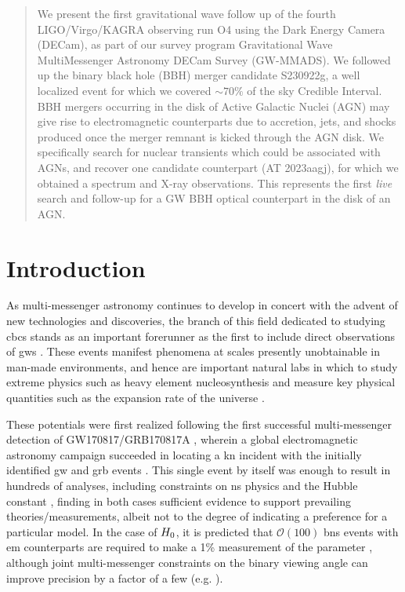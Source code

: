 \documentclass[twocolumn]{aastex631}
\begin{document}
\begin{abstract}
We present the first gravitational wave follow up of the fourth LIGO/Virgo/KAGRA observing run O4 using the Dark Energy Camera (DECam), as part of our survey program Gravitational Wave MultiMessenger Astronomy DECam Survey (GW-MMADS). We followed up the binary black hole (BBH) merger candidate S230922g, a well localized event for which we covered $\sim 70\%$ of the sky Credible Interval. BBH mergers occurring in the disk of Active Galactic Nuclei (AGN) may give rise to electromagnetic counterparts due to accretion, jets, and shocks produced once the merger remnant is kicked through the AGN disk. We specifically search for nuclear transients which could be associated with AGNs, and recover one candidate counterpart (AT 2023aagj), for which we obtained a spectrum and X-ray observations. This represents the first \emph{live} search and follow-up for a GW BBH optical counterpart in the disk of an AGN.
\end{abstract}

\section{Introduction}
\label{sec:intro}

As multi-messenger astronomy continues to develop in concert with the advent of new technologies and discoveries, the branch of this field dedicated to studying \glspl{cbc} stands as an important forerunner as the first to include direct observations of \glspl{gw} \citep{abbottMultimessengerObservationsBinary2017}.
These events manifest phenomena at scales presently unobtainable in man-made environments, and hence are important natural labs in which to study extreme physics such as heavy element nucleosynthesis \citep{symbalistyNeutronStarCollisions1982} and measure key physical quantities such as the expansion rate of the universe \citep{schutzDeterminingHubbleConstant1986, holzUsingGravitationalWaveStandard2005}.

These potentials were first realized following the first successful multi-messenger detection of GW170817/GRB170817A \citep{abbottGravitationalWavesGammaRays2017}, wherein a global electromagnetic astronomy campaign succeeded in locating a \gls{kn} incident with the initially identified \gls{gw} and \gls{grb} events \citep{abbottMultimessengerObservationsBinary2017}.
This single event by itself was enough to result in hundreds of analyses, including constraints on \gls{ns} physics \citep{abbottGW170817MeasurementsNeutron2018} and the Hubble constant \citep{abbottGravitationalwaveStandardSiren2017}, finding in both cases sufficient evidence to support prevailing theories/measurements, albeit not to the degree of indicating a preference for a particular model.
In the case of $H_{\rm 0}$, it is predicted that $\mathcal{O}(100)$ \gls{bns} events with \gls{em} counterparts are required to make a 1\% measurement of the parameter \citep{chenTwoCentHubble2018}, although joint multi-messenger constraints on the binary viewing angle can improve precision by a factor of a few (e.g. \citealt{palmeseStandardSirenMeasurement2023}).
\end{document}
